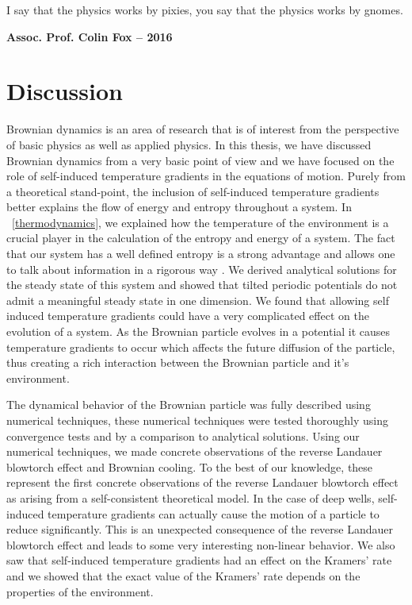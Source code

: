 \epigraph{I say that the physics works by pixies, you say that the physics works by gnomes.}{\textbf{Assoc. Prof. Colin Fox -- 2016}}
\section{Discussion}
Brownian dynamics is an area of research that is of interest from the perspective of basic physics as well as applied physics. In this thesis, we have discussed Brownian dynamics from a very basic point of view and we have focused on the role of self-induced temperature gradients in the equations of motion.  Purely from a theoretical stand-point, the inclusion of self-induced temperature gradients better explains the flow of energy and entropy throughout a system. In ~\autoref{thermodynamics}, we explained how the temperature of the environment is a crucial player in the calculation of the entropy and energy of a system. The fact that our system has a well defined entropy is a strong advantage and allows one to talk about information in a rigorous way \cite{Landauer1961,MyersCelebranoKrishnan2015}. We derived analytical solutions for the steady state of this system and showed that tilted periodic potentials do not admit a meaningful steady state in one dimension. We found that allowing self induced temperature gradients could have a very complicated effect on the evolution of a system. As the Brownian particle evolves in a potential it causes temperature gradients to occur which affects the future diffusion of the particle, thus creating a rich interaction between the Brownian particle and it's environment.

The dynamical behavior of the Brownian particle was fully described using numerical techniques, these numerical techniques were tested thoroughly using convergence tests and by a comparison to analytical solutions. Using our numerical techniques, we made concrete observations of the reverse Landauer blowtorch effect and Brownian cooling. To the best of our knowledge, these represent the first concrete observations of the reverse Landauer blowtorch effect as arising from a self-consistent theoretical model. In the case of deep wells, self-induced temperature gradients can actually cause the motion of a particle to reduce significantly. This is an unexpected consequence of the reverse Landauer blowtorch effect and leads to some very interesting non-linear behavior. We also saw that self-induced temperature gradients had an effect on the Kramers' rate and we showed that the exact value of the Kramers' rate depends on the properties of the environment.

